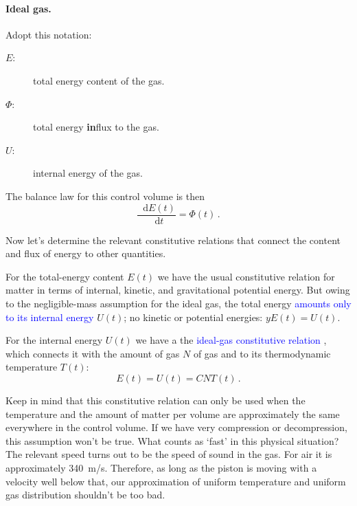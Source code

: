 \documentclass[a4paper,12pt,%
onecolumn,oneside,%
british%
]{memoir}
\newcommand*{\di}{\mathop{}\!\mathrm{d}}%
\renewcommand*{\|}[1][]{\nonscript\:#1\vert\nonscript\:\mathopen{}}
\newcommand*{\sect}{\S}%
\renewcommand*{\autoref}[3][\sect\,\ref]{\textcolor{blue}{#3}
\raisebox{0.6ex}{\color{blue}\miniscule%
\faIcon{angle-right}%
\;#1{#2}\;p.\,\pageref{#2}}}
\newcommand*{\dt}{\di t}
\newcommand*{\yN}{N}
\newcommand*{\yE}{E}
\newcommand*{\yU}{U}
\newcommand*{\yH}{\varPhi}%
\newcommand*{\yT}{T}%
\begin{document}
\bigskip

\paragraph{Ideal gas.}

Adopt this notation:
\begin{description}
\item[$\yE$:] total energy content of the gas.
\item[$\yH$:] total energy \textbf{in}flux to the gas.
\item[$\yU$:] internal energy of the gas.
\end{description}
The balance law for this control volume is then
\begin{equation*}
  \frac{\di \yE(t)}{\dt} = \yH(t) \,.
\end{equation*}

Now let's determine the relevant constitutive relations that connect the content and flux of energy to other quantities.

For the total-energy content $\yE(t)$ we have the usual constitutive relation for matter in terms of internal, kinetic, and gravitational potential energy. But owing to the negligible-mass assumption for the ideal gas, the total energy
\autoref{sec:further_idealgas}{amounts only to its internal energy} $\yU(t)$; no kinetic or potential energies: $yE(t) = \yU(t)$.

For the internal energy $\yU(t)$ we have a the \autoref{def:internalenergy_gas}{ideal-gas constitutive relation}, which connects it with the amount of gas $\yN$ of gas and to its thermodynamic temperature $\yT(t)$:
\begin{equation}
  \label{eq:gas_ex_energy}
  \yE(t) = \yU(t) = C\yN\yT(t) \,.
\end{equation}
\begin{warning}
  Keep in mind that this constitutive relation can only be used when the temperature and the amount of matter per volume are approximately the same everywhere in the control volume. If we have very compression or decompression, this assumption won't be true. What counts as \enquote*{fast} in this physical situation? The relevant speed turns out to be the speed of sound in the gas. For air it is approximately \qty{340}{m/s}. Therefore, as long as the piston is moving with a velocity well below that, our approximation of uniform temperature and uniform gas distribution shouldn't be too bad.
\end{warning}
\end{document}
